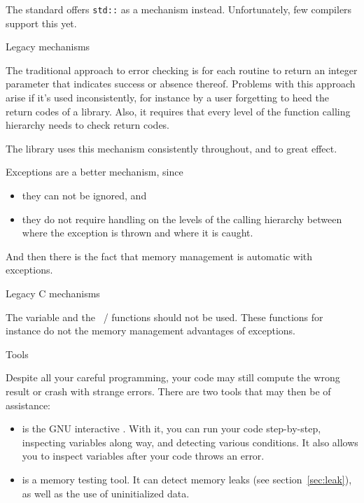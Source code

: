 The  standard offers
\texttt{std::} as a mechanism instead.
Unfortunately, few compilers support this yet.
%

 {Legacy mechanisms}

The traditional approach to error checking is for each routine to
return an integer parameter that indicates success or absence
thereof. 
Problems with this approach arise if it's used inconsistently, for
instance by a user forgetting to heed the return codes of a library.
Also, it requires that every level of the function calling hierarchy
needs to check return codes.

The  library uses this mechanism
consistently throughout, and to great effect.

Exceptions are a better mechanism, since
\begin{itemize}
\item they can not be ignored, and
\item they do not require handling on the levels of the calling
  hierarchy between where the exception is thrown and where it is caught.
\end{itemize}
And then there is the fact that memory management is automatic with
exceptions.

 {Legacy C mechanisms}

The  variable and the
~/  functions should not be
used. These functions for instance do not the memory management
advantages of exceptions.

 {Tools}

Despite all your careful programming, your code may still compute the
wrong result or crash with strange errors. There are two tools that
may then be of assistance:
\begin{itemize}
\item {} is the GNU interactive
  . With it, you can run your code step-by-step,
  inspecting variables along way, and detecting various conditions. It
  also allows you to inspect variables after your code throws an
  error.
\item {} is a memory testing tool. It can detect
  memory leaks
  (see section~\ref{sec:leak}),
  as well as the use of uninitialized data.
\end{itemize}
